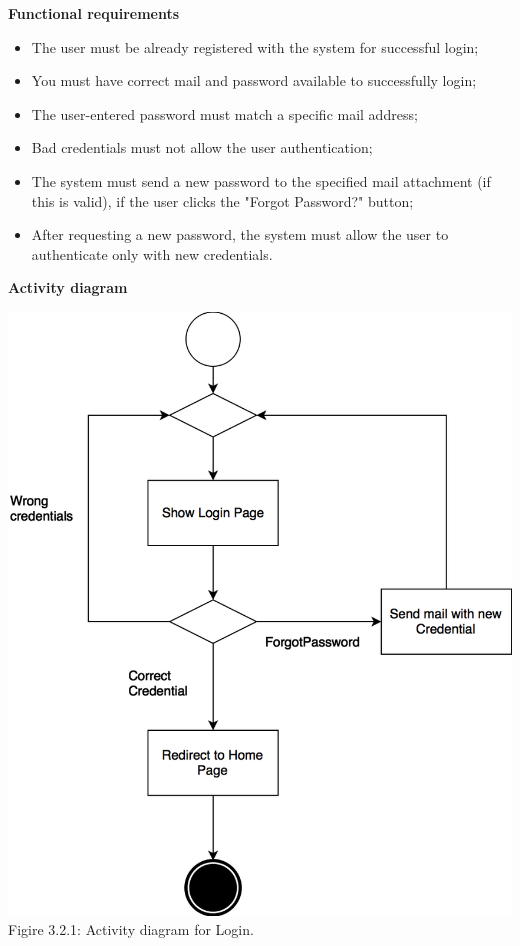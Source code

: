 \documentclass{article}
\begin{document}
	\bigskip
	\noindent
	\textbf{Functional requirements} \\
	\begin{itemize}
		\item The user must be already registered with the system for successful login;
		\item You must have correct mail and password available to successfully login;
		\item The user-entered password must match a specific mail address;
		\item Bad credentials must not allow the user authentication;
		\item The system must send a new password to the specified mail attachment (if this is valid), if the user clicks the "Forgot Password?" button;
		\item After requesting a new password, the system must allow the user to authenticate only with new credentials.
	\end{itemize}
	
	\newpage
	\noindent
	\textbf{Activity diagram} \\
	
	\begin{center}
		\includegraphics[scale=0.25]{img/diagrams/login_ad.png} \\ \bigskip
		Figire 3.2.1: Activity diagram for Login.
	\end{center}
	
\end{document}
